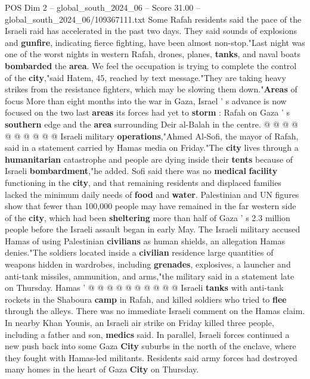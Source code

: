\begin{textsample}{POS Dim 2 – global\_south\_2024\_06 – Score 31.00 – global\_south\_2024\_06/109367111.txt}
Some Rafah residents said the pace of the Israeli raid has accelerated in the past two days.
They said sounds of explosions and \textbf{gunfire}, indicating fierce fighting, have been almost non-stop."Last night was one of the worst nights in western Rafah, drones, planes, \textbf{tanks}, and naval boats \textbf{bombarded} the \textbf{area}.
We feel the occupation is trying to complete the control of the \textbf{city},"said Hatem, 45, reached by text message."They are taking heavy strikes from the resistance fighters, which may be slowing them down."\textbf{Areas} of focus More than eight months into the war in Gaza, Israel ' s advance is now focused on the two last \textbf{areas} its forces had yet to \textbf{storm} : Rafah on Gaza ' s \textbf{southern} edge and the \textbf{area} surrounding Deir al-Balah in the centre. @ @ @ @ @ @ @ @ @ @ Israeli military \textbf{operations},"Ahmed Al-Sofi, the mayor of Rafah, said in a statement carried by Hamas media on Friday."The \textbf{city} lives through a \textbf{humanitarian} catastrophe and people are dying inside their \textbf{tents} because of Israeli \textbf{bombardment},"he added.
Sofi said there was no \textbf{medical} \textbf{facility} functioning in the \textbf{city}, and that remaining residents and displaced families lacked the minimum daily needs of \textbf{food} and \textbf{water}.
Palestinian and UN figures show that fewer than 100,000 people may have remained in the far western side of the \textbf{city}, which had been \textbf{sheltering} more than half of Gaza ' s 2.3 million people before the Israeli assault began in early May.
The Israeli military accused Hamas of using Palestinian \textbf{civilians} as human shields, an allegation Hamas denies."The soldiers located inside a \textbf{civilian} residence large quantities of weapons hidden in wardrobes, including \textbf{grenades}, explosives, a launcher and anti-tank missiles, ammunition, and arms,"the military said in a statement late on Thursday.
Hamas ' @ @ @ @ @ @ @ @ @ @ Israeli \textbf{tanks} with anti-tank rockets in the Shaboura \textbf{camp} in Rafah, and killed soldiers who tried to \textbf{flee} through the alleys.
There was no immediate Israeli comment on the Hamas claim.
In nearby Khan Younis, an Israeli air strike on Friday killed three people, including a father and son, \textbf{medics} said.
In parallel, Israeli forces continued a new push back into some Gaza \textbf{City} suburbs in the north of the enclave, where they fought with Hamas-led militants.
Residents said army forces had destroyed many homes in the heart of Gaza \textbf{City} on Thursday.

\end{textsample}
